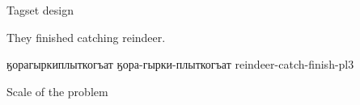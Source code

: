 \documentclass{beamer}
\begin{document}

\begin{frame}{Tagset design}

% 

\end{frame}

\begin{frame}

They finished catching reindeer.

ӄорагыркиплыткогъат
ӄора-гырки-плыткогъат
reindeer-catch-finish-{\sc pl3}

\end{frame}

\begin{frame}{Scale of the problem}



\end{frame}
\end{document}
